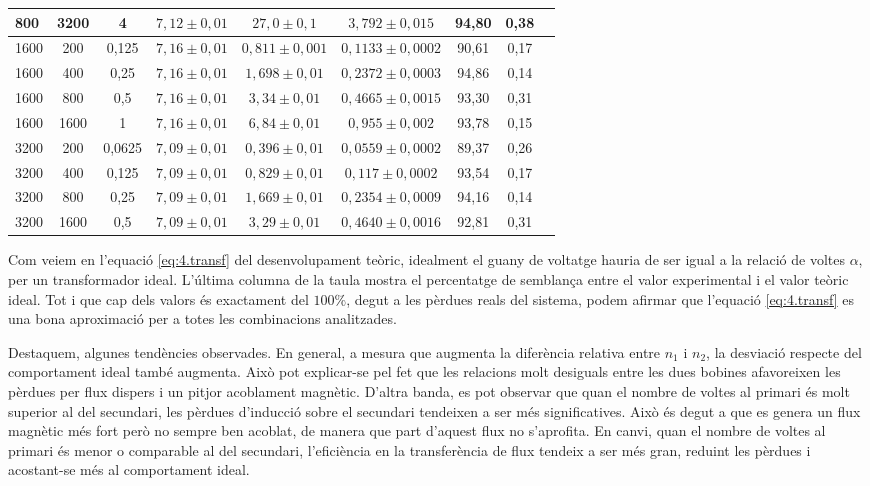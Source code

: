 \documentclass[a4paper,10.5pt]{report}
\begin{document}
\begin{table}[H]
\begin{tabular}{lcccccccc}
		800 & 3200 & 4 & $7{,}12 \pm 0{,}01$ & $27{,}0 \pm 0{,}1$ & $3{,}792 \pm 0{,}015$ & 94,80 & 0,38 \\
		\midrule
		1600 & 200 & 0{,}125 & $7{,}16 \pm 0{,}01$ & $0{,}811 \pm 0{,}001$ & $0{,}1133 \pm 0{,}0002$ & 90,61 & 0,17 \\
		1600 & 400 & 0{,}25 & $7{,}16 \pm 0{,}01$ & $1{,}698 \pm 0{,}01$ & $0{,}2372 \pm 0{,}0003$ & 94,86 & 0,14 \\
		1600 & 800 & 0{,}5 & $7{,}16 \pm 0{,}01$ & $3{,}34 \pm 0{,}01$ & $0{,}4665 \pm 0{,}0015$ & 93,30 & 0,31 \\
		1600 & 1600 & 1 & $7{,}16 \pm 0{,}01$ & $6{,}84 \pm 0{,}01$ & $0{,}955 \pm 0{,}002$ & 93,78 & 0,15 \\
		\midrule
		3200 & 200 & 0{,}0625 & $7{,}09 \pm 0{,}01$ & $0{,}396 \pm 0{,}01$ & $0{,}0559 \pm 0{,}0002$ & 89,37 & 0,26 \\
		3200 & 400 & 0{,}125 & $7{,}09 \pm 0{,}01$ & $0{,}829 \pm 0{,}01$ & $0{,}117 \pm 0{,}0002$ & 93,54 & 0,17 \\
		3200 & 800 & 0{,}25 & $7{,}09 \pm 0{,}01$ & $1{,}669 \pm 0{,}01$ & $0{,}2354 \pm 0{,}0009$ & 94,16 & 0,14 \\
		3200 & 1600 & 0{,}5 & $7{,}09 \pm 0{,}01$ & $3{,}29 \pm 0{,}01$ & $0{,}4640 \pm 0{,}0016$ & 92,81 & 0,31 \\
		\bottomrule
	\end{tabular}
	\label{tab:4.2}
\end{table}

Com veiem en l'equació \eqref{eq:4.transf} del desenvolupament teòric, idealment el guany de voltatge hauria de ser igual a la relació de voltes $\alpha$, per un transformador ideal. L'última columna de la taula mostra el percentatge de semblança entre el valor experimental i el valor teòric ideal. Tot i que cap dels valors és exactament del $100\%$, degut a les pèrdues reals del sistema, podem afirmar que l'equació \eqref{eq:4.transf} es una bona aproximació per a totes les combinacions analitzades. 

Destaquem,  algunes tendències observades. En general, a mesura que augmenta la diferència relativa entre $n_1$ i $n_2$, la desviació respecte del comportament ideal també augmenta. Això pot explicar-se pel fet que les relacions molt desiguals entre les dues bobines afavoreixen les pèrdues per flux dispers i un pitjor acoblament magnètic. D'altra banda, es pot observar que quan el nombre de voltes al primari és molt superior al del secundari, les pèrdues d'inducció sobre el secundari tendeixen a ser més significatives. Això és degut a que es genera un flux magnètic més fort però no sempre ben acoblat, de manera que part d’aquest flux no s’aprofita. En canvi, quan el nombre de voltes al primari és menor o comparable al del secundari, l’eficiència en la transferència de flux tendeix a ser més gran, reduint les pèrdues i acostant-se més al comportament ideal.
\end{document}
